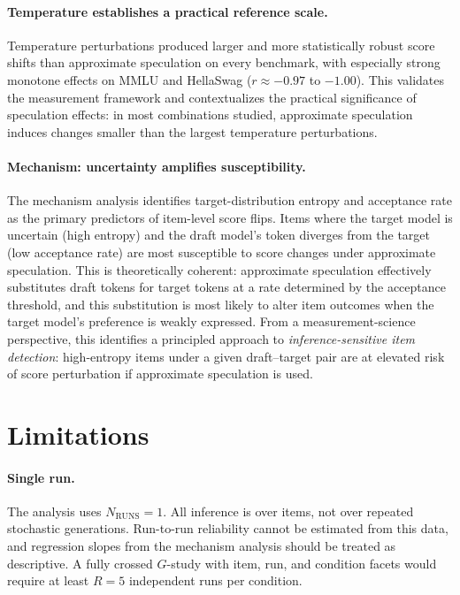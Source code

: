 \documentclass{article}
\begin{document}
\paragraph{Temperature establishes a practical reference scale.} Temperature perturbations produced larger and more statistically robust score shifts than approximate speculation on every benchmark, with especially strong monotone effects on MMLU and HellaSwag ($r \approx -0.97$ to $-1.00$). This validates the measurement framework and contextualizes the practical significance of speculation effects: in most combinations studied, approximate speculation induces changes smaller than the largest temperature perturbations.

\paragraph{Mechanism: uncertainty amplifies susceptibility.} The mechanism analysis identifies target-distribution entropy and acceptance rate as the primary predictors of item-level score flips. Items where the target model is uncertain (high entropy) and the draft model's token diverges from the target (low acceptance rate) are most susceptible to score changes under approximate speculation. This is theoretically coherent: approximate speculation effectively substitutes draft tokens for target tokens at a rate determined by the acceptance threshold, and this substitution is most likely to alter item outcomes when the target model's preference is weakly expressed. From a measurement-science perspective, this identifies a principled approach to \emph{inference-sensitive item detection}: high-entropy items under a given draft--target pair are at elevated risk of score perturbation if approximate speculation is used.

\section{Limitations}

\paragraph{Single run.} The analysis uses $N_{\text{RUNS}}{=}1$. All inference is over items, not over repeated stochastic generations. Run-to-run reliability cannot be estimated from this data, and regression slopes from the mechanism analysis should be treated as descriptive. A fully crossed $G$-study with item, run, and condition facets would require at least $R = 5$ independent runs per condition.
\end{document}

